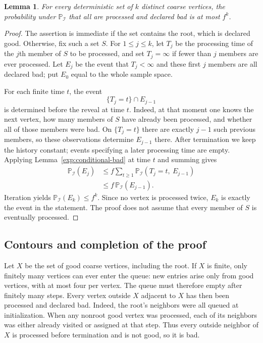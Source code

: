 \documentclass[11pt]{article}
\newtheorem{lemma}[theorem]{Lemma}
\theoremstyle{definition}
\theoremstyle{remark}
\numberwithin{equation}{section}
\begin{document}
\begin{lemma}
\label{exp:bad-set}
For every deterministic set of $k$ distinct coarse vertices, the
probability under $\mathbb P_{\mathcal I}$ that all are processed and
declared bad is at most $f^k$.
\end{lemma}

\begin{proof}
The assertion is immediate if the set contains the root, which is
declared good. Otherwise, fix such a set $S$. For $1\le j\le k$, let
$T_j$ be the processing time of the $j$th member of $S$ to be processed,
and set $T_j=\infty$ if fewer than $j$ members are ever processed. Let
$E_j$ be the event that $T_j<\infty$ and these first $j$ members are
all declared bad; put $E_0$ equal to the whole sample space.

For each finite time $t$, the event
\[
 \{T_j=t\}\cap E_{j-1}
\]
is determined before the reveal at time $t$. Indeed, at that moment
one knows the next vertex, how many members of $S$ have already
been processed, and whether all of those members were bad.
On $\{T_j=t\}$ there are exactly $j-1$ such previous members,
so these observations determine $E_{j-1}$ there.
After termination we keep the history constant; events specifying
a later processing time are empty. Applying
Lemma~\ref{exp:conditional-bad} at time $t$ and summing gives
\begin{align*}
 \mathbb P_{\mathcal I}(E_j)
 &\le f\sum_{t\ge1}
       \mathbb P_{\mathcal I}(T_j=t,\ E_{j-1})\\
 &\le f\,\mathbb P_{\mathcal I}(E_{j-1}).
\end{align*}
Iteration yields $\mathbb P_{\mathcal I}(E_k)\le f^k$. Since no
vertex is processed twice, $E_k$ is exactly the event in the statement.
The proof does not assume that every member of $S$ is eventually
processed.
\end{proof}

\subsection{Contours and completion of the proof}

Let $X$ be the set of good coarse vertices, including the root. If $X$
is finite, only finitely many vertices can ever enter the queue: new
entries arise only from good vertices, with at most four per vertex.
The queue must therefore empty after finitely many steps. Every vertex
outside $X$ adjacent to $X$ has then been processed and declared bad.
Indeed, the root's neighbors were all queued at initialization. When
any nonroot good vertex was processed, each of its neighbors was either
already visited or assigned at that step. Thus every outside neighbor
of $X$ is processed before termination and is not good, so it is bad.
\end{document}
